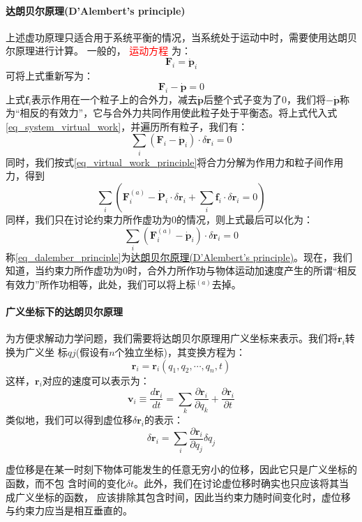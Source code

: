\paragraph*{达朗贝尔原理(D'Alembert's principle)}
上述虚功原理只适合用于系统平衡的情况，当系统处于运动中时，需要使用达朗贝尔原理进行计算。
一般的，\textcolor{red}{ 运动方程 }为：
\begin{equation*}
	\bm{F}_i = \dot{\bm{p}}_i
\end{equation*} 
可将上式重新写为：
\begin{equation*}
	\bm{F}_i - \dot{\bm{p}} = 0
\end{equation*}
上式$\bm{f}_i$表示作用在一个粒子上的合外力，减去$\dot{\bm{p}}$后整个式子变为了0，我们将$-\dot{\bm{p}}$称为“相反的有效力”，它与合外力共同作用使此粒子处于平衡态。将上式代入式\eqref{eq_system_virtual_work}，并遍历所有粒子，我们有：
\begin{equation}
	\sum_{i}(\bm{F}_i - \dot{\bm{p}}_i) \cdot \delta \bm{r}_i = 0
\end{equation} 
同时，我们按式\eqref{eq_virtual_work_principle}将合力分解为作用力和粒子间作用力，得到
\begin{equation*}
	\sum_i (\bm{F}^{(a)}_i - \dot{\bm{P}}_i \cdot \delta \bm{r}_i + \sum_i \bm{f}_i \cdot \delta \bm{r}_i = 0)
\end{equation*} 
同样，我们只在讨论约束力所作虚功为0的情况，则上式最后可以化为：
\begin{equation}
	\sum_i (\bm{F}^{(a)}_{i} - \dot{\bm{p}}_i) \cdot \delta \bm{r}_i = 0	\label{eq_dalember_principle}
\end{equation} 
称\eqref{eq_dalember_principle}为\underline{达朗贝尔原理(D'Alembert's principle)}。现在，我们知道，当约束力所作虚功为0时，合外力所作功与物体运动加速度产生的所谓“相反有效力”所作功相等，此处，我们可以将上标$^{(a)}$去掉。

\paragraph*{广义坐标下的达朗贝尔原理}
为方便求解动力学问题，我们需要将达朗贝尔原理用广义坐标来表示。我们将$\bm{r}_i$转换为广义坐
标$q{j}$(假设有$n$个独立坐标)，其变换方程为：
\begin{equation*}
	\bm{r}_i = \bm{r}_i(q_1, q_2, \cdots , q_n, t)
\end{equation*} 
这样，$\bm{r}_i$对应的速度可以表示为：
\begin{equation*}
	\bm{v}_i \equiv \frac{d\bm{r}_i}{dt} = \sum_k \frac{\partial \bm{r}_i}{\partial q_k} + \frac{\partial \bm{r}_i}{\partial t}
\end{equation*} 
类似地，我们可以得到虚位移$\delta\bm{r}_i$的表示：
\begin{equation*}
	\delta\bm{r}_i = \sum_i \frac{\partial \bm{r}_i}{\partial q_j}\delta q_j
\end{equation*} 
\begin{note}
	虚位移是在某一时刻下物体可能发生的任意无穷小的位移，因此它只是广义坐标的函数，而不包
    含时间的变化$\delta t$。此外，我们在讨论虚位移时确实也只应该将其当成广义坐标的函数，
    应该排除其包含时间，因此当约束力随时间变化时，虚位移与约束力应当是相互垂直的。
\end{note}
